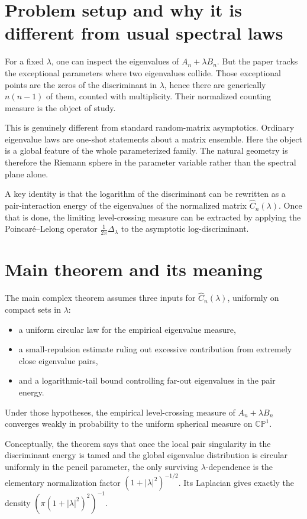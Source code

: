 \documentclass[11pt]{article}
\begin{document}
\section*{Problem setup and why it is different from usual spectral laws}
For a fixed $\lambda$, one can inspect the eigenvalues of $A_n+\lambda B_n$. But the paper tracks the exceptional parameters where two eigenvalues collide. Those exceptional points are the zeros of the discriminant in $\lambda$, hence there are generically $n(n-1)$ of them, counted with multiplicity. Their normalized counting measure is the object of study.

This is genuinely different from standard random-matrix asymptotics. Ordinary eigenvalue laws are one-shot statements about a matrix ensemble. Here the object is a global feature of the whole parameterized family. The natural geometry is therefore the Riemann sphere in the parameter variable rather than the spectral plane alone.

A key identity is that the logarithm of the discriminant can be rewritten as a pair-interaction energy of the eigenvalues of the normalized matrix $\widehat C_n(\lambda)$. Once that is done, the limiting level-crossing measure can be extracted by applying the Poincar\'e--Lelong operator $\frac{1}{2\pi}\Delta_\lambda$ to the asymptotic log-discriminant.

\section*{Main theorem and its meaning}
The main complex theorem assumes three inputs for $\widehat C_n(\lambda)$, uniformly on compact sets in $\lambda$:
\begin{itemize}
\item a uniform circular law for the empirical eigenvalue measure,
\item a small-repulsion estimate ruling out excessive contribution from extremely close eigenvalue pairs,
\item and a logarithmic-tail bound controlling far-out eigenvalues in the pair energy.
\end{itemize}
Under those hypotheses, the empirical level-crossing measure of $A_n+\lambda B_n$ converges weakly in probability to the uniform spherical measure on $\mathbb{CP}^1$.

Conceptually, the theorem says that once the local pair singularity in the discriminant energy is tamed and the global eigenvalue distribution is circular uniformly in the pencil parameter, the only surviving $\lambda$-dependence is the elementary normalization factor $(1+|\lambda|^2)^{-1/2}$. Its Laplacian gives exactly the density $(\pi(1+|\lambda|^2)^2)^{-1}$.
\end{document}
